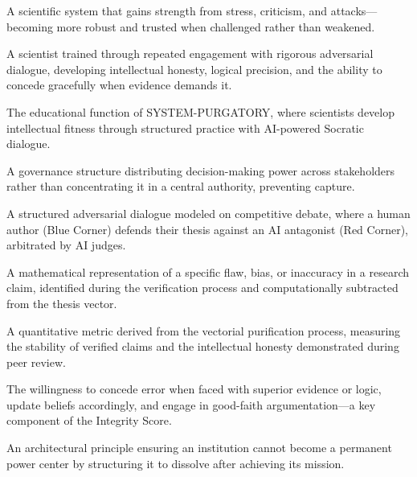 \documentclass[11pt,a4paper]{article}
\begin{document}
\begin{description}[style=nextline, leftmargin=0pt, labelindent=0pt, font=\normalfont\bfseries]
    \item[Antifragile Science] A scientific system that gains strength from stress, criticism, and attacks—becoming more robust and trusted when challenged rather than weakened.
    
    \item[Cognitive Athlete] A scientist trained through repeated engagement with rigorous adversarial dialogue, developing intellectual honesty, logical precision, and the ability to concede gracefully when evidence demands it.
    
    \item[Cognitive Gymnasium] The educational function of SYSTEM-PURGATORY, where scientists develop intellectual fitness through structured practice with AI-powered Socratic dialogue.
    
    \item[DAO (Decentralized Autonomous Organization)] A governance structure distributing decision-making power across stakeholders rather than concentrating it in a central authority, preventing capture.
    
    \item[Epistemological Boxing Match] A structured adversarial dialogue modeled on competitive debate, where a human author (Blue Corner) defends their thesis against an AI antagonist (Red Corner), arbitrated by AI judges.
    
    \item[Error Vector ($\vec{\epsilon}_j$)] A mathematical representation of a specific flaw, bias, or inaccuracy in a research claim, identified during the verification process and computationally subtracted from the thesis vector.
    
    \item[Integrity Score] A quantitative metric derived from the vectorial purification process, measuring the stability of verified claims and the intellectual honesty demonstrated during peer review.
    
    \item[Intellectual Honesty (H)] The willingness to concede error when faced with superior evidence or logic, update beliefs accordingly, and engage in good-faith argumentation—a key component of the Integrity Score.
    
    \item[Limited by Design] An architectural principle ensuring an institution cannot become a permanent power center by structuring it to dissolve after achieving its mission.
    

\end{description}
\end{document}

